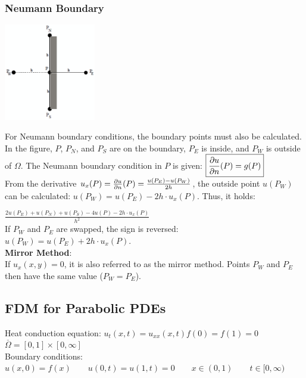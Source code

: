 \subsubsection{Neumann Boundary
}
\begin{minipage}{4cm}
	\includegraphics[width=4cm]{Content/02_numerics/NeumannRand.png}
\end{minipage}
\hfill
\begin{minipage}{14cm}
For Neumann boundary conditions, the boundary points must also be calculated.
In the figure, $P$, $P_N$, and $P_S$ are on the boundary,
$P_E$ is inside, and $P_W$ is outside of $\Omega$.
The Neumann boundary condition in $P$ is given: $\boxed{\frac{\partial u}{\partial n}(P)=g(P)}$\\
From the derivative $u_x(P) = \frac{\partial u}{\partial n}(P) = \frac{u(P_E)-u(P_W)}{2h}$,
the outside point $u(P_W)$ can be calculated: $u(P_W)=u(P_E)-2h\cdot u_x(P)$.
Thus, it holds:

$\boxed{\frac{2u(P_E) + u(P_N) +
u(P_S)- 4 u(P) - 2h\cdot u_x(P)}{h^2}}$\\

If $P_W$ and $P_E$ are swapped, the sign is reversed:
$u(P_W)=u(P_E)+2h\cdot u_x(P)$.\\

\textbf{Mirror Method}:\\
If $u_x(x,y) = 0$, it is also referred to as the mirror method. Points $P_W$ and $P_E$ then have the same value ($P_W=P_E$).
\end{minipage}


\subsection{FDM for Parabolic PDEs}
Heat conduction equation: $\boxed{u_t(x,t)=u_{xx}(x,t)}$\qquad $f(0)=f(1)=0$ \qquad$ \overset{\_}{\Omega}=[0,1]\times [0,\infty]$\\

Boundary conditions: $u(x,0)=f(x) \qquad u(0,t)=u(1,t)=0\qquad x\in(0,1) \qquad t\in[0,\infty)$

